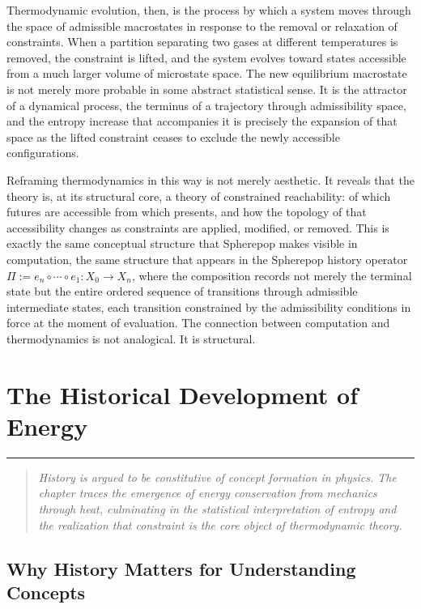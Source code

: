 \documentclass[12pt,openany]{book}
\theoremstyle{plain}
\theoremstyle{definition}
\theoremstyle{remark}
\newcommand{\chapterrule}{%
  \vspace{4pt}%
  {\color{SpherepopBlue}\rule{\textwidth}{0.8pt}}%
  \vspace{10pt}%
}
\newenvironment{chapterprecis}{%
  \begin{quote}\small\itshape}{%
  \end{quote}\medskip}
\begin{document}
Thermodynamic evolution, then, is the process by which a system moves through the space of admissible macrostates in response to the removal or relaxation of constraints. When a partition separating two gases at different temperatures is removed, the constraint is lifted, and the system evolves toward states accessible from a much larger volume of microstate space. The new equilibrium macrostate is not merely more probable in some abstract statistical sense. It is the attractor of a dynamical process, the terminus of a trajectory through admissibility space, and the entropy increase that accompanies it is precisely the expansion of that space as the lifted constraint ceases to exclude the newly accessible configurations.

Reframing thermodynamics in this way is not merely aesthetic. It reveals that the theory is, at its structural core, a theory of constrained reachability: of which futures are accessible from which presents, and how the topology of that accessibility changes as constraints are applied, modified, or removed. This is exactly the same conceptual structure that Spherepop makes visible in computation, the same structure that appears in the Spherepop history operator $\Pi := e_n \circ \cdots \circ e_1 : X_0 \to X_n$, where the composition records not merely the terminal state but the entire ordered sequence of transitions through admissible intermediate states, each transition constrained by the admissibility conditions in force at the moment of evaluation. The connection between computation and thermodynamics is not analogical. It is structural.

\chapter{The Historical Development of Energy}
\chapterrule

\begin{chapterprecis}
History is argued to be constitutive of concept formation in
physics. The chapter traces the emergence of energy conservation
from mechanics through heat, culminating in the statistical
interpretation of entropy and the realization that constraint is
the core object of thermodynamic theory.
\end{chapterprecis}

\section{Why History Matters for Understanding Concepts}
\end{document}
